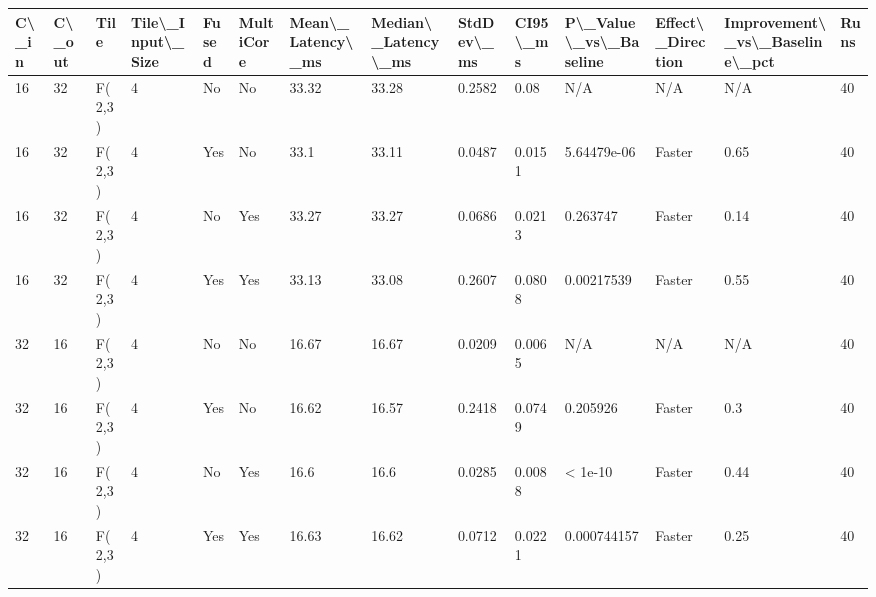 \begin{table}[t]
\centering
\begin{tabular}{llllllllllllll}
\toprule
 C\textbackslash \_in &  C\textbackslash \_out &    Tile &  Tile\textbackslash \_Input\textbackslash \_Size & Fused & MultiCore & Mean\textbackslash \_Latency\textbackslash \_ms & Median\textbackslash \_Latency\textbackslash \_ms & StdDev\textbackslash \_ms & CI95\textbackslash \_ms & P\textbackslash \_Value\textbackslash \_vs\textbackslash \_Baseline & Effect\textbackslash \_Direction & Improvement\textbackslash \_vs\textbackslash \_Baseline\textbackslash \_pct &  Runs \\
\midrule
    16 &      32 &  F(2,3) &                  4 &    No &        No &             33.32 &               33.28 &     0.2582 &     0.08 &                    N/A &               N/A &                            N/A &    40 \\
    16 &      32 &  F(2,3) &                  4 &   Yes &        No &              33.1 &               33.11 &     0.0487 &   0.0151 &            5.64479e-06 &            Faster &                           0.65 &    40 \\
    16 &      32 &  F(2,3) &                  4 &    No &       Yes &             33.27 &               33.27 &     0.0686 &   0.0213 &               0.263747 &            Faster &                           0.14 &    40 \\
    16 &      32 &  F(2,3) &                  4 &   Yes &       Yes &             33.13 &               33.08 &     0.2607 &   0.0808 &             0.00217539 &            Faster &                           0.55 &    40 \\
    32 &      16 &  F(2,3) &                  4 &    No &        No &             16.67 &               16.67 &     0.0209 &   0.0065 &                    N/A &               N/A &                            N/A &    40 \\
    32 &      16 &  F(2,3) &                  4 &   Yes &        No &             16.62 &               16.57 &     0.2418 &   0.0749 &               0.205926 &            Faster &                            0.3 &    40 \\
    32 &      16 &  F(2,3) &                  4 &    No &       Yes &              16.6 &                16.6 &     0.0285 &   0.0088 &                < 1e-10 &            Faster &                           0.44 &    40 \\
    32 &      16 &  F(2,3) &                  4 &   Yes &       Yes &             16.63 &               16.62 &     0.0712 &   0.0221 &            0.000744157 &            Faster &                           0.25 &    40 \\

\end{tabular}
\end{table}
